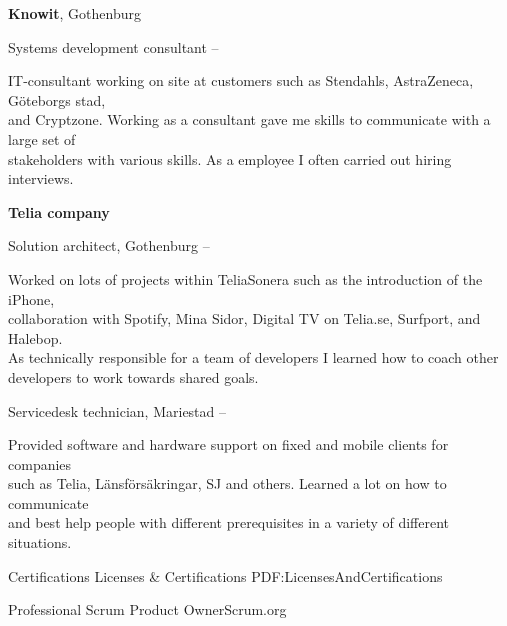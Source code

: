 \documentclass[letterpaper,MMMyyyy,nonstopmode]{resume}
\begin{document}
\begin{Body}
\BigGap
\Entry
\textbf{Knowit}, Gothenburg

\Gap
\BulletItem
Systems development consultant
\hfill
{} --

\begin{Detail}
\SubBulletItem
IT-consultant working on site at customers such as Stendahls, AstraZeneca, Göteborgs stad,\\and Cryptzone. Working as a consultant gave me skills to communicate with a large set of\\stakeholders with various skills. As a employee I often carried out hiring interviews.
\end{Detail}

\BigGap
\Entry
\textbf{Telia company}

\Gap
\BulletItem
Solution architect, Gothenburg
\hfill
{} --

\begin{Detail}
\SubBulletItem
Worked on lots of projects within TeliaSonera such as the introduction of the iPhone,\\collaboration with Spotify, Mina Sidor, Digital TV on Telia.se, Surfport, and Halebop.\\As technically responsible for a team of developers I learned how to coach other\\developers to work towards shared goals.
\end{Detail}

\Gap
\BulletItem
Servicedesk technician, Mariestad
\hfill
{} --

\begin{Detail}
\SubBulletItem
Provided software and hardware support on fixed and mobile clients for companies\\ such as Telia, Länsförsäkringar, SJ and others. Learned a lot on how to communicate\\ and best help people with different prerequisites in a variety of different situations.
\end{Detail}



\Section
{Certifications}
{Licenses \& Certifications}
{PDF:LicensesAndCertifications}

\BulletItem
Professional Scrum Product Owner\newline Scrum.org
\hfill
{}


\end{Body}
\end{document}
